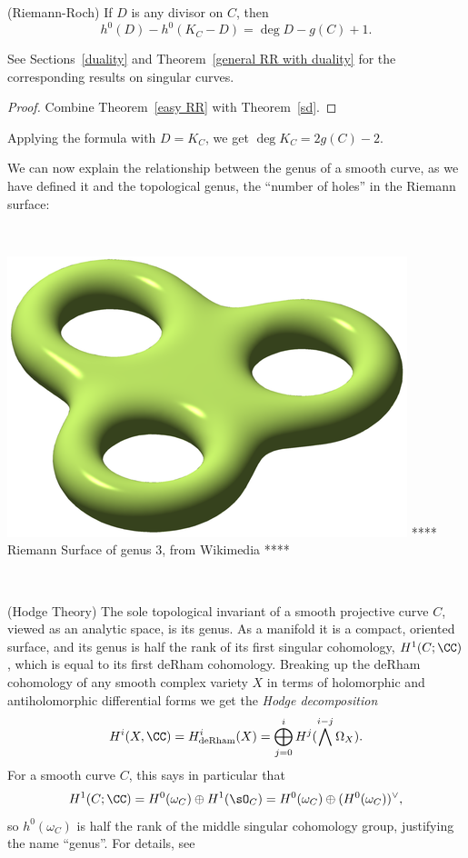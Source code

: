 \begin{theorem} (Riemann-Roch)\label{RR theorem}
If $D$ is any divisor on $C$, then 
$$
h^0(D) - h^0(K_C -D) = \deg D - g(C) +1.
$$
\end{theorem}
See Sections~\ref{duality} and Theorem~\ref{general RR with duality} for the corresponding results on singular curves.

\begin{proof}
Combine Theorem~\ref{easy RR} with Theorem~\ref{sd}.
\end{proof}
Applying the formula with $D = K_C$, we get 
$\deg K_C = 2g(C) -2$.

We can now explain the relationship between the genus of a smooth curve, as we have defined it and the 
topological genus, the ``number of holes'' in the Riemann surface:

\

\includegraphics[scale = 1]{RiemannSurface}
**** Riemann Surface of genus 3, from Wikimedia ****

\

\begin{fact} (Hodge Theory)
The sole topological invariant of a smooth projective curve $C$, viewed as an analytic space, is its genus. As a manifold it is a compact, oriented surface, and its genus is half the rank of its first singular cohomology, $H^{1}(C; \CC)$, which is equal to its first deRham cohomology.
Breaking up the deRham cohomology of any smooth complex variety $X$ in terms of holomorphic and antiholomorphic differential
forms we get the \emph{Hodge decomposition}
$$
H^i(X,\CC) = H^i_{\rm de Rham}(X) = \bigoplus_{j=0}^i H^j(\bigwedge^{i-j} \Omega_X).
$$
For a smooth curve $C$, this says in  particular that
$$
H^1(C; \CC) = H^0(\omega_C)\oplus H^1(\sO_C) = H^0(\omega_C)\oplus (H^0(\omega_C))^\vee, 
$$
so $ h^0(\omega_C)$ is half the rank of the middle singular cohomology group, justifying the name ``genus''. For details, see~\cite[p. 116]{Griffiths-Harris1978}
\end{fact}


